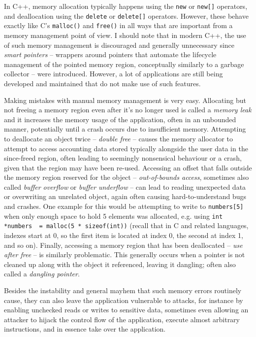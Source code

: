 In C++, memory allocation typically happens using the \lstinline!new! or \lstinline!new[]! operators, and deallocation using the \lstinline!delete! or \lstinline!delete[]! operators. However, these behave exactly like C's \lstinline!malloc()! and \lstinline!free()! in all ways that are important from a memory management point of view. I should note that in modern C++, the use of such memory management is discouraged and generally unnecessary since \emph{smart pointers} -- wrappers around pointers that automate the lifecycle management of the pointed memory region, conceptually similarly to a garbage collector -- were introduced. However, a lot of applications are still being developed and maintained that do not make use of such features.

Making mistakes with manual memory management is very easy. Allocating but not freeing a memory region even after it's no longer used is called a \emph{memory leak} and it increases the memory usage of the application, often in an unbounded manner, potentially until a crash occurs due to insufficient memory. Attempting to deallocate an object twice -- \emph{double free} -- causes the memory allocator to attempt to access accounting data stored typically alongside the user data in the since-freed region, often leading to seemingly nonsensical behaviour or a crash, given that the region may have been re-used. Accessing an offset that falls outside the memory region reserved for the object -- \emph{out-of-bounds access}, sometimes also called \emph{buffer overflow} or \emph{buffer underflow} -- can lead to reading unexpected data or overwriting an unrelated object, again often causing hard-to-understand bugs and crashes. One example for this would be attempting to write to \lstinline!numbers[5]! when only enough space to hold 5 elements was allocated, e.g. using \lstinline!int *numbers  = malloc(5 * sizeof(int))! (recall that in C and related languages, indexes start at 0, so the first item is located at index 0, the second at index 1, and so on). Finally, accessing a memory region that has been deallocated -- \emph{use after free} -- is similarly problematic. This generally occurs when a pointer is not cleaned up along with the object it referenced, leaving it dangling; often also called a \emph{dangling pointer}.

Besides the instability and general mayhem that such memory errors routinely cause, they can also leave the application vulnerable to attacks, for instance by enabling unchecked reads or writes to sensitive data, sometimes even allowing an attacker to hijack the control flow of the application, execute almost arbitrary instructions, and in essence take over the application.

